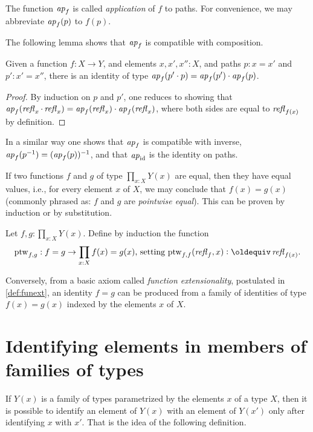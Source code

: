 The function $\mathop{{\it ap}_{f}}$ is called {\em application} of $f$ to paths.  For convenience, we may abbreviate $\mathop{{\it ap}_{f}} (p)$ to $f(p)$.

The following lemma shows that $\mathop{{\it ap}_{f}}$ is compatible with composition.

\begin{lemma}\label{lem:apcomp}
  Given a function $f:X\to Y$, and elements $x,x',x'':X$, and paths $p : x = x'$ and $p' : x' = x''$,
  there is an identity of type $\mathop{{\it ap}_{f}} (p' \cdot p) =  \mathop{{\it ap}_{f}} (p') \cdot  \mathop{{\it ap}_{f}} (p)$.
\end{lemma}

\begin{proof}
  By induction on $p$ and $p'$, one reduces to showing that $\mathop{{\it ap}_{f}} (\mathop{{\it refl}_{x}} \cdot \mathop{{\it refl}_{x}}) =  \mathop{{\it ap}_{f}} ( \mathop{{\it refl}_{x}} ) \cdot  \mathop{{\it ap}_{f}} ( \mathop{{\it refl}_{x}} )$, where
  both sides are equal to $\mathop{{\it refl}_{ f(x) }}$ by definition.
\end{proof}

In a similar way one shows that $\mathop{{\it ap}_{f}}$ is compatible with inverse,
$\mathop{{\it ap}_{f}}(p^{-1}) =  (\mathop{{\it ap}_{f}} (p))^{-1}$, and that $\mathop{{\it ap}_{\mathord{\mathrm{id}}}}$ is the identity on paths. 

If two functions $f$ and $g$ of type $\prod_{x:X} Y(x)$ are equal, 
then they have equal values, i.e., for every element $x$ of $X$, 
we may conclude that $f(x) = g(x)$ (commonly phrased as:
$f$ and $g$ are \emph{pointwise equal}).
This can be proven by induction or by substitution.

\begin{definition}\label{def:ptw}
Let $f,g:\prod_{x:X} Y(x)$. Define by induction the function
\[ 
{\ptw}_{f,g}: f=g \to \prod_{x:X} f(x)=g(x) 
\text{,~setting ${\ptw}_{f,f}(\refl{f},x)\defeq\refl{f(x)}$.}
\] 
\end{definition}

Conversely, from a basic axiom called \emph{function extensionality}, 
postulated in \cref{def:funext}, an identity $f=g$ can be produced from a 
family of identities of type $f(x) = g(x)$ indexed by the elements $x$ of $X$. 

\section{Identifying elements in members of families of types}

If $Y(x)$ is a family of types parametrized by the elements $x$ of a type $X$, then it is possible to identify an element of $Y(x)$ with an
element of $Y(x')$ only after identifying $x$ with $x'$.  That is the idea of the following definition.

